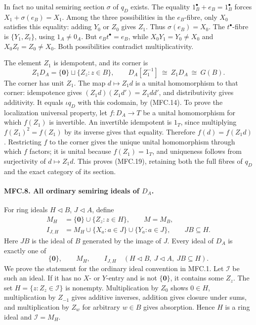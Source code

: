 In fact no unital semiring section \(\sigma\) of \(q_D\) exists.
The equality \(1_B^\bullet+e_B=1_B^\bullet\) forces
\(X_1+\sigma(e_B)=X_1\). Among the three possibilities in the
\(e_B\)-fibre, only \(X_0\) satisfies this equality: adding \(Y_0\)
or \(Z_0\) gives \(Z_1\). Thus \(\sigma(e_B)=X_0\).
The \(t^\bullet\)-fibre is \(\{Y_1,Z_t\}\), using \(1_A\ne0_A\).
But \(e_Bt^\bullet=e_B\), while
\(X_0Y_1=Y_0\ne X_0\) and \(X_0Z_t=Z_0\ne X_0\).
Both possibilities contradict multiplicativity.

The element \(Z_1\) is idempotent, and its corner is
\[
 Z_1D_A=\{\mathbf0\}\sqcup\{Z_z:z\in B\},\qquad
 D_A[Z_1^{-1}]\ \cong\ Z_1D_A\ \cong\ G(B).               \tag{MFC.19}
\]
The corner has unit \(Z_1\). The map \(d\mapsto Z_1d\)
is a unital homomorphism to that corner: idempotence gives
\((Z_1d)(Z_1d')=Z_1dd'\), and distributivity gives additivity.
It equals \(\iota q_D\) with this codomain, by (MFC.14).
To prove the localization universal property, let \(f:D_A\to T\)
be a unital homomorphism for which \(f(Z_1)\) is invertible.
An invertible idempotent is \(1_T\), since multiplying
\(f(Z_1)^2=f(Z_1)\) by its inverse gives that equality.
Therefore \(f(d)=f(Z_1d)\). Restricting \(f\) to the corner gives
the unique unital homomorphism through which \(f\) factors; it is
unital because \(f(Z_1)=1_T\), and uniqueness follows from
surjectivity of \(d\mapsto Z_1d\).
This proves (MFC.19), retaining both the full fibres of \(q_D\)
and the exact category of its section.

\paragraph{MFC.8. All ordinary semiring ideals of \(D_A\).}
For ring ideals \(H\triangleleft B\), \(J\triangleleft A\), define
\[
 \begin{aligned}
 M_H&=\{\mathbf0\}\cup\{Z_z:z\in H\},\qquad M=M_B,\\
 I_{J,H}&=M_H\cup\{X_a:a\in J\}\cup\{Y_a:a\in J\},
               \qquad JB\subseteq H .
 \end{aligned}                                           \tag{MFC.20}
\]
Here \(JB\) is the ideal of \(B\) generated by the image of \(J\).
Every ideal of \(D_A\) is exactly one of
\[
 \{\mathbf0\},\qquad M_H,\qquad I_{J,H}
 \quad(H\triangleleft B,\ J\triangleleft A,\ JB\subseteq H).
                                                               \tag{MFC.21}
\]
We prove the statement for the ordinary ideal convention in MFC.1.
Let \(\mathcal I\) be such an ideal. If it has no \(X\)- or \(Y\)-entry
and is not \(\{\mathbf0\}\), it contains some \(Z_z\). The set
\(H=\{z:Z_z\in\mathcal I\}\) is nonempty. Multiplication by
\(Z_0\) shows \(0\in H\), multiplication by \(Z_{-1}\) gives
additive inverses, addition gives closure under sums, and
multiplication by \(Z_w\) for arbitrary \(w\in B\) gives absorption.
Hence \(H\) is a ring ideal and \(\mathcal I=M_H\).

